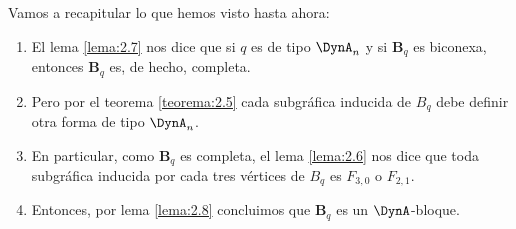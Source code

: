 Vamos a recapitular lo que hemos visto hasta ahora:\\
\begin{enumerate}
\item El lema \ref{lema:2.7} nos dice que si $q$ es de tipo $\DynA_{n}$ y si $\textbf{B}_{q}$ es biconexa, entonces $\textbf{B}_{q}$ es, de hecho, completa.
\item Pero por el teorema \ref{teorema:2.5} cada subgráfica inducida de $B_{q}$ debe definir otra forma de tipo $\DynA_{n}$.
\item En particular, como $\textbf{B}_{q}$ es completa, el lema \ref{lema:2.6} nos dice que toda subgráfica inducida por cada tres vértices de $B_{q}$ es $F_{3,0}$ o $F_{2,1}$.
\item Entonces, por lema \ref{lema:2.8} concluimos que $\textbf{B}_{q}$ es un $\DynA$-bloque.
\end{enumerate}

